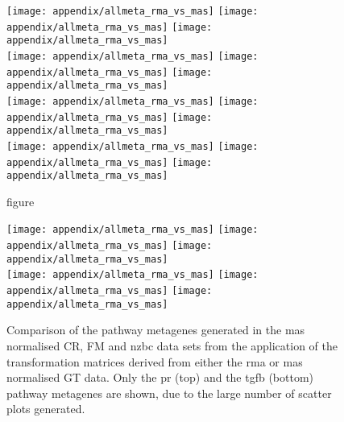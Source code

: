\begin{appendices}
	\begin{figure}[htpb]
		\ContinuedFloat
		\captionsetup{list=off,format=cont}
		\centering
		\texttt{[image: appendix/allmeta\_rma\_vs\_mas]}
		\texttt{[image: appendix/allmeta\_rma\_vs\_mas]}
		\texttt{[image: appendix/allmeta\_rma\_vs\_mas]}\\
		\texttt{[image: appendix/allmeta\_rma\_vs\_mas]}
		\texttt{[image: appendix/allmeta\_rma\_vs\_mas]}
		\texttt{[image: appendix/allmeta\_rma\_vs\_mas]}\\
		\texttt{[image: appendix/allmeta\_rma\_vs\_mas]}
		\texttt{[image: appendix/allmeta\_rma\_vs\_mas]}
		\texttt{[image: appendix/allmeta\_rma\_vs\_mas]}\\
		\texttt{[image: appendix/allmeta\_rma\_vs\_mas]}
		\texttt{[image: appendix/allmeta\_rma\_vs\_mas]}
		\texttt{[image: appendix/allmeta\_rma\_vs\_mas]}\\
		\caption[]{figure}
	\end{figure}

	\begin{figure}[htp!]
		\centering
		\texttt{[image: appendix/allmeta\_rma\_vs\_mas]}
		\texttt{[image: appendix/allmeta\_rma\_vs\_mas]}
		\texttt{[image: appendix/allmeta\_rma\_vs\_mas]}\\
		\texttt{[image: appendix/allmeta\_rma\_vs\_mas]}
		\texttt{[image: appendix/allmeta\_rma\_vs\_mas]}
		\texttt{[image: appendix/allmeta\_rma\_vs\_mas]}
		\caption[Comparison of the pathway metagenes generated in the \acrshort{mas} normalised CR, FM and \gls{nzbc} data sets from the application of the transformation matrices derived from either the \acrshort{rma} or \acrshort{mas} normalised GT data]{Comparison of the pathway metagenes generated in the \acrshort{mas} normalised CR, FM and \gls{nzbc} data sets from the application of the transformation matrices derived from either the \acrshort{rma} or \acrshort{mas} normalised GT data.
	Only the \gls{pr} (top) and the \gls{tgfb}  (bottom) pathway metagenes are shown, due to the large number of scatter plots generated.
	}
		\label{fig:appendix/gt_meta_rma_mas_other_data}
	\end{figure}


\end{appendices}
